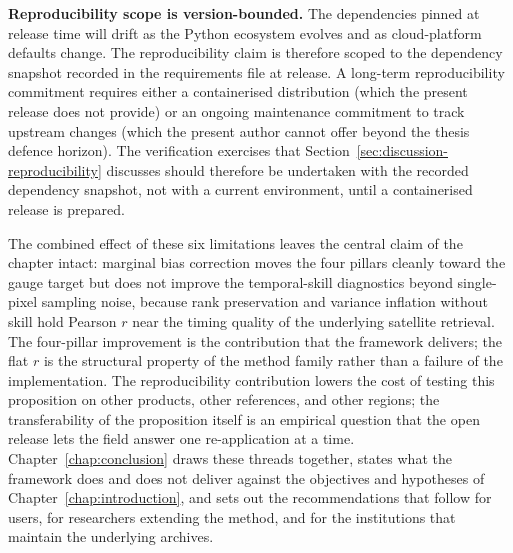 \textbf{Reproducibility scope is version-bounded.} The
dependencies pinned at release time will drift as the Python
ecosystem evolves and as cloud-platform defaults change. The
reproducibility claim is therefore scoped to the dependency
snapshot recorded in the requirements file at release. A long-term
reproducibility commitment requires either a containerised
distribution (which the present release does not provide) or an
ongoing maintenance commitment to track upstream changes (which
the present author cannot offer beyond the thesis defence
horizon). The verification exercises that
Section~\ref{sec:discussion-reproducibility} discusses should
therefore be undertaken with the recorded dependency snapshot,
not with a current environment, until a containerised release is
prepared.

The combined effect of these six limitations leaves the central
claim of the chapter intact: marginal bias correction moves the
four pillars cleanly toward the gauge target but does not improve
the temporal-skill diagnostics beyond single-pixel sampling noise,
because rank preservation and variance inflation without skill hold
Pearson $r$ near the timing quality of the underlying satellite
retrieval. The four-pillar
improvement is the contribution that the framework delivers; the
flat $r$ is the structural property of the method family rather
than a failure of the implementation. The reproducibility
contribution lowers the cost of testing this proposition on other
products, other references, and other regions; the transferability
of the proposition itself is an empirical question that the open
release lets the field answer one re-application at a time.
Chapter~\ref{chap:conclusion} draws these threads together, states
what the framework does and does not deliver against the objectives
and hypotheses of Chapter~\ref{chap:introduction}, and sets out the
recommendations that follow for users,
for researchers extending the method, and for the institutions that
maintain the underlying archives.
